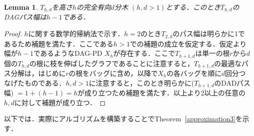 \documentclass[master]{kuisthesis}		%
\theoremstyle{plain}
\newtheorem{lemma}{Lemma}
\theoremstyle{definition}
\begin{document}
\begin{lemma}\label{comp_tree}
    $T_{h, d}$を高さ$h$の完全有向$d$分木 $(h, d > 1)$とする．このとき$T_{h, d}$のDAGパス幅は$h-1$である．
\end{lemma}

\begin{proof}
    $h$に関する数学的帰納法で示す．$h=2$のとき$T_{2, d}$のパス幅は明らかに1であるため補題を満たす．ここである$h > 1$での補題の成立を仮定する．仮定より幅が$h-1$であるようなDAG-PD $X_h$が存在する．ここで$T_{h+1, d}$は単一の根$r$から$d$個の$T_{h, d}$の根に枝を伸ばしたグラフであることに注意すると，$T_{h+1, d}$の最適なパス分解は，はじめに$r$の根をバッグに含め，以降で$X_h$の各バッグを順に$d$回分つなげたものである．$h, d > 1$に注意すると，このとき明らかに($T_{h+1, d}$のDADパス幅) $= 1 + (h-1) = h$が成り立つため補題を満たす．以上より2以上の任意の$h, d$に対して補題が成り立つ．
\end{proof}



以下では．実際にアルゴリズムを構築することでTheorem~\ref{approximation3}を示す．
\end{document}

